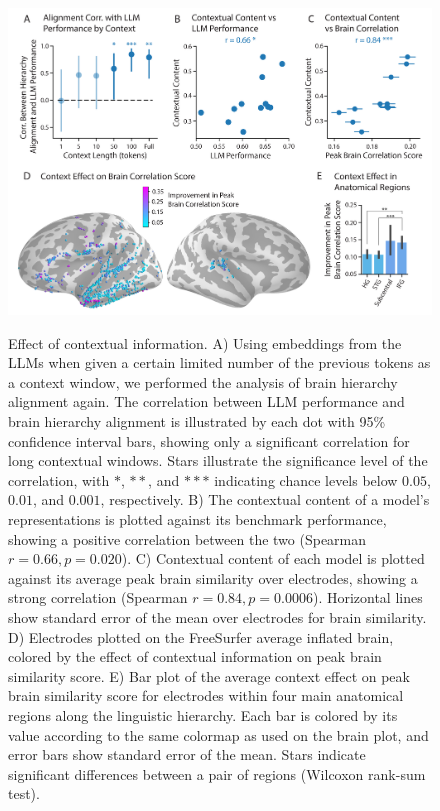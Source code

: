 \begin{figure}[!t]
  \centering
  {\includegraphics[width=0.95\linewidth]{figures/Figure_context_effects_expandedBrain-01.png}}
  \caption{Effect of contextual information. A) Using embeddings from the LLMs when given a certain limited number of the previous tokens as a context window, we performed the analysis of brain hierarchy alignment again. The correlation between LLM performance and brain hierarchy alignment is illustrated by each dot with 95\% confidence interval bars, showing only a significant correlation for long contextual windows. Stars illustrate the significance level of the correlation, with $*$, $**$, and $***$ indicating chance levels below $0.05$, $0.01$, and $0.001$, respectively. B) The contextual content of a model's representations is plotted against its benchmark performance, showing a positive correlation between the two (Spearman $r=0.66, p=0.020$). C) Contextual content of each model is plotted against its average peak brain similarity over electrodes, showing a strong correlation (Spearman $r=0.84, p=0.0006$). Horizontal lines show standard error of the mean over electrodes for brain similarity. D) Electrodes plotted on the FreeSurfer average inflated brain, colored by the effect of contextual information on peak brain similarity score. E) Bar plot of the average context effect on peak brain similarity score for electrodes within four main anatomical regions along the linguistic hierarchy. Each bar is colored by its value according to the same colormap as used on the brain plot, and error bars show standard error of the mean. Stars indicate significant differences between a pair of regions (Wilcoxon rank-sum test).}
  \label{fig:5}
\end{figure}

